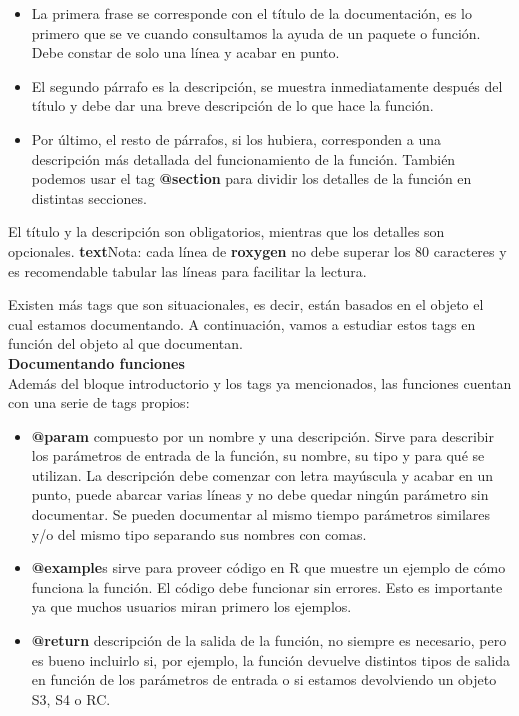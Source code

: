\begin{itemize}
    \item La primera frase se corresponde con el t\'itulo de la documentaci\'on, es lo primero que
se ve cuando consultamos la ayuda de un paquete o funci\'on. Debe constar de solo
una l\'inea y acabar en punto.
    \item El segundo p\'arrafo es la descripci\'on, se muestra inmediatamente despu\'es del t\'itulo y
debe dar una breve descripci\'on de lo que hace la funci\'on.
    \item Por \'ultimo, el resto de p\'arrafos, si los hubiera, corresponden a una descripci\'on m\'as
detallada del funcionamiento de la funci\'on. Tambi\'en podemos usar el tag \textbf{@section}
para dividir los detalles de la funci\'on en distintas secciones.
\end{itemize}

El t\'itulo y la descripci\'on son obligatorios, mientras que los detalles son opcionales.
\textbf{text}{Nota}: cada l\'inea de \textbf{roxygen} no debe superar los 80 caracteres y es recomendable tabular
las l\'ineas para facilitar la lectura.

Existen m\'as tags que son situacionales, es decir, est\'an basados en el objeto el cual estamos
documentando. A continuaci\'on, vamos a estudiar estos tags en funci\'on del objeto al que
documentan. \\
\textbf{Documentando funciones} \\
Adem\'as del bloque introductorio y los tags ya mencionados, las funciones cuentan con una
serie de tags propios:
\begin{itemize}
    \item \textbf{@param} compuesto por un nombre y una descripci\'on. Sirve para describir los
par\'ametros de entrada de la funci\'on, su nombre, su tipo y para qu\'e se utilizan.
La descripci\'on debe comenzar con letra may\'uscula y acabar en un punto, puede
abarcar varias l\'ineas y no debe quedar ning\'un par\'ametro sin documentar.
Se pueden documentar al mismo tiempo par\'ametros similares y/o del mismo tipo
separando sus nombres con comas.
    \item \textbf{@example}s sirve para proveer c\'odigo en R que muestre un ejemplo de c\'omo funciona
la funci\'on. El c\'odigo debe funcionar sin errores. Esto es importante ya que muchos
usuarios miran primero los ejemplos.
    \item \textbf{@return} descripci\'on de la salida de la funci\'on, no siempre es necesario, pero es
bueno incluirlo si, por ejemplo, la funci\'on devuelve distintos tipos de salida en funci\'on
de los par\'ametros de entrada o si estamos devolviendo un objeto S3, S4 o RC.
\end{itemize}

